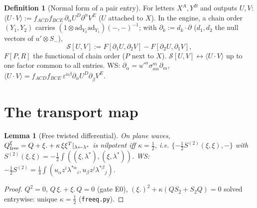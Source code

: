 \documentclass[11pt]{article}
\newtheorem{lemma}[theorem]{Lemma}
\theoremstyle{definition}
\newtheorem{definition}[theorem]{Definition}
\newcommand{\Qx}{Q^{\xi}}
\newcommand{\ad}{\mathrm{ad}}
\newcommand{\WS}{\textup{WS}}
\begin{document}
\begin{definition}[Normal form of a pair entry]
For letters $X^A,Y^B$ and outputs $U,V$: $\langle U\cdot V\rangle:=f_{ACD}f_{BCE}\,\partial_{\dot\alpha}U^D\partial^{\dot\alpha}V^E$ ($U$ attached to $X$). In the engine, a chain order $(Y_1,Y_2)$ carries $(1\otimes\ad_{Y_2}\ad_{Y_1})(-,-)^{-1}$; with $\partial_k:=d_k\cdot\partial$ ($d_1,d_2$ the null vectors of $u'\otimes S_-$),
\[
\mathcal S[U,V]:=F[\partial_1U,\partial_2V]-F[\partial_2U,\partial_1V],
\]
$F[P,R]$ the functional of chain order ($P$ next to $X$). $\mathcal S[U,V]\leftrightarrow\langle U\cdot V\rangle$ up to one factor common to all entries. \WS: $\partial_{\dot\alpha}=u'^\alpha\sigma^m_{\alpha\dot\alpha}\partial_m$, $\langle U\cdot V\rangle=f_{ACD}f_{BCE}\,\varepsilon^{\dot\alpha\dot\beta}\partial_{\dot\alpha}U^D\partial_{\dot\beta}V^E$.
\end{definition}

\section{The transport map}

\begin{lemma}[Free twisted differential]\label{lem:free}
On plane waves, $\Qx_{\rm free}=Q+\xi.+\kappa\,\xi\xi^{T}|_{\lambda\leftarrow\lambda^*}$ is nilpotent iff $\kappa=\tfrac12$, i.e. $\{-\tfrac12S^{(2)}(\xi,\xi),-\}$ with $S^{(2)}(\xi,\xi)=-\tfrac12\int((\xi,\lambda^*),(\xi,\lambda^*))$.
\WS: $-\tfrac12S^{(2)}=\tfrac14\int(u_\alpha z^i\lambda^{*\alpha}{}_i,u_\beta z^j\lambda^{*\beta}{}_j)$.
\end{lemma}
\begin{proof}
$Q^2=0$, $Q\,\xi.+\xi.\,Q=0$ (gate E0), $(\xi.)^2+\kappa(Q S_2+S_2Q)=0$ solved entrywise: unique $\kappa=\tfrac12$ (\texttt{freeq.py}).
\end{proof}
\end{document}

